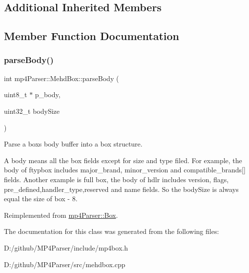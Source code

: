 \subsection*{Additional Inherited Members}


\subsection{Member Function Documentation}
\mbox{\label{classmp4_parser_1_1_mehd_box_aa63f552035700d1159607d7285e494b1}} 
\subsubsection{\texorpdfstring{parseBody()}{parseBody()}}
{\footnotesize\ttfamily int mp4\+Parser\+::\+Mehd\+Box\+::parse\+Body (\begin{DoxyParamCaption}\item[{uint8\+\_\+t $\ast$}]{p\+\_\+body,  }\item[{uint32\+\_\+t}]{body\+Size }\end{DoxyParamCaption})\hspace{0.3cm}{\ttfamily [virtual]}}



Parse a box\textquotesingle{}s body buffer into a box structure. 

A body means all the box fields except for size and type filed. For example, the body of ftypbox includes major\+\_\+brand, minor\+\_\+version and compatible\+\_\+brands\mbox{[}\mbox{]} fields. Another example is full box, the body of hdlr includes version, flags, pre\+\_\+defined,handler\+\_\+type,reserved and name fields. So the body\+Size is always equal the size of box -\/ 8. 

Reimplemented from \mbox{\hyperlink{classmp4_parser_1_1_box_a3dd0c084ac65bc77b69ac5ecaf796cb2}{mp4\+Parser\+::\+Box}}.



The documentation for this class was generated from the following files\+:\begin{DoxyCompactItemize}
\item 
D\+:/github/\+M\+P4\+Parser/include/mp4box.\+h\item 
D\+:/github/\+M\+P4\+Parser/src/mehdbox.\+cpp\end{DoxyCompactItemize}
